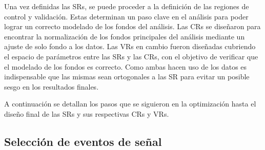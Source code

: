 Una vez definidas las SRs, se puede proceder a la definición de las regiones de control y validación. Estas determinan un paso clave en el análisis para poder lograr un correcto modelado de los fondos del análisis. Las CRs se diseñaron para encontrar la normalización de los fondos principales del análisis mediante un ajuste de solo fondo a los datos. Las VRs en cambio fueron diseñadas cubriendo el espacio de parámetros entre las SRs y las CRs, con el objetivo de verificar que el modelado de los fondos es correcto. Como ambas hacen uso de los datos es indispensable que las mismas sean ortogonales a las SR para evitar un posible sesgo en los resultados finales.

A continuación se detallan los pasos que se siguieron en la optimización hasta el diseño final de las SRs y sus respectivas CRs y VRs.

\subsection{Selección de eventos de señal}\label{sec:sig_selection}

